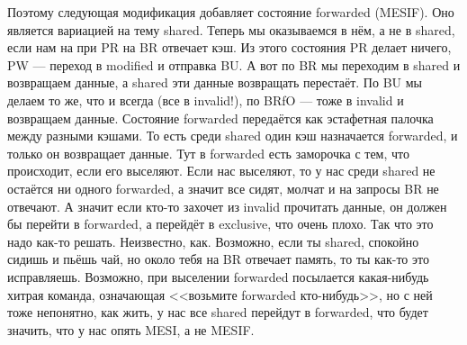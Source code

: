 \documentclass{article}
\begin{document}
    Поэтому следующая модификация добавляет состояние forwarded (MESIF). Оно является вариацией на тему shared. Теперь мы оказываемся в нём, а не в shared, если нам на при {\color{red}PR} на {\color{darkgreen}BR} отвечает кэш. Из этого состояния {\color{red}PR} делает ничего, {\color{red}PW} --- переход в modified и отправка {\color{darkgreen}BU}. А вот по {\color{blue}BR} мы переходим в shared и возвращаем данные, а shared эти данные возвращать перестаёт. По {\color{blue}BU} мы делаем то же, что и всегда (все в invalid!), по {\color{blue}BRfO} --- тоже в invalid и возвращаем данные. Состояние forwarded передаётся как эстафетная палочка между разными кэшами. То есть среди shared один кэш назначается forwarded, и только он возвращает данные. Тут в forwarded есть заморочка с тем, что происходит, если его выселяют. Если нас выселяют, то у нас среди shared не остаётся ни одного forwarded, а значит все сидят, молчат и на запросы {\color{blue}BR} не отвечают. А значит если кто-то захочет из invalid прочитать данные, он должен бы перейти в forwarded, а перейдёт в exclusive, что очень плохо. Так что это надо как-то решать. Неизвестно, как. Возможно, если ты shared, спокойно сидишь и пьёшь чай, но около тебя на {\color{blue}BR} отвечает память, то ты как-то это исправляешь. Возможно, при выселении forwarded посылается какая-нибудь хитрая команда, означающая <<возьмите forwarded кто-нибудь>>, но с ней тоже непонятно, как жить, у нас все shared перейдут в forwarded, что будет значить, что у нас опять MESI, а не MESIF.
\end{document}
